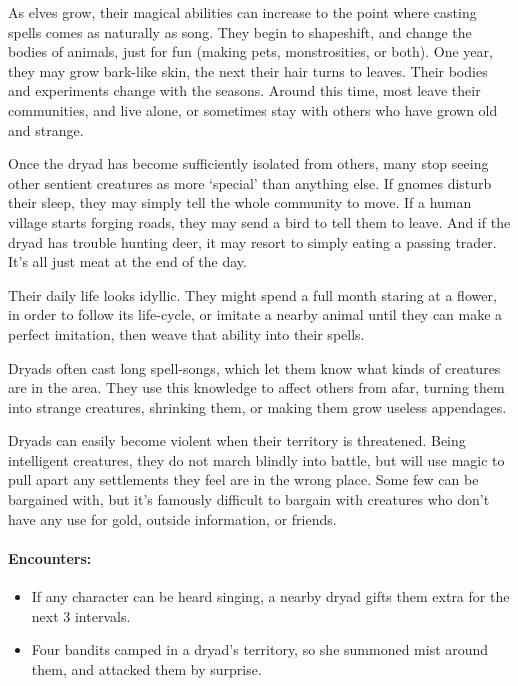 \begin{multicols}{2}


\noindent
As elves grow, their magical abilities can increase to the point where casting spells comes as naturally as song.
They begin to shapeshift, and change the bodies of animals, just for fun (making pets, monstrosities, or both).
One year, they may grow bark-like skin, the next their hair turns to leaves.
Their bodies and experiments change with the seasons.
Around this time, most leave their communities, and live alone, or sometimes stay with others who have grown old and strange.

Once the dryad has become sufficiently isolated from others, many stop seeing other sentient creatures as more `special' than anything else.
If gnomes disturb their sleep, they may simply tell the whole community to move.
If a human \gls{village} starts forging roads, they may send a bird to tell them to leave.
And if the dryad has trouble hunting deer, it may resort to simply eating a passing trader.
It's all just meat at the end of the day.

Their daily life looks idyllic.
They might spend a full month staring at a flower, in order to follow its life-cycle, or imitate a nearby animal until they can make a perfect imitation, then weave that ability into their spells.

\dryad

\showStdSpells

Dryads often cast long spell-songs, which let them know what kinds of creatures are in the area.
They use this knowledge to affect others from afar, turning them into strange creatures, shrinking them, or making them grow useless appendages.

Dryads can easily become violent when their territory is threatened.
Being intelligent creatures, they do not march blindly into battle, but will use magic to pull apart any settlements they feel are in the wrong place.
Some few can be bargained with, but it's famously difficult to bargain with creatures who don't have any use for gold, outside information, or friends.

\paragraph{Encounters:}

\begin{itemize}

  \item
  If any character can be heard singing, a nearby dryad gifts them extra  for the next 3 \glspl{interval}.
  \item
  Four bandits camped in a dryad's territory, so she summoned mist around them, and attacked them by surprise.


\end{itemize}
\end{multicols}
